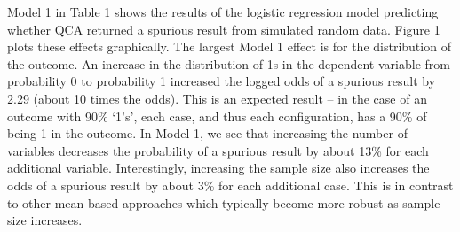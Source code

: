 \documentclass[]{article}
\begin{document}
{Model 1 in Table 1 shows the results of the logistic regression model predicting whether QCA returned a spurious result from simulated random data. Figure 1 plots these effects graphically. The largest Model 1 effect is for the distribution of the outcome. An increase in the distribution of 1s in the dependent variable from probability 0 to probability 1 increased the logged odds of a spurious result by 2.29 (about 10 times the odds). This is an expected result -- in the case of an outcome with 90\% `1's', each case, and thus each configuration, has a 90\% of being 1 in the outcome. In Model 1, we see that increasing the number of variables decreases the probability of a spurious result by about 13\% for each additional variable. Interestingly, increasing the sample size also increases the odds of a spurious result by about 3\% for each additional case. This is in contrast to other mean-based approaches which typically become more robust as sample size increases.

}
\end{document}
